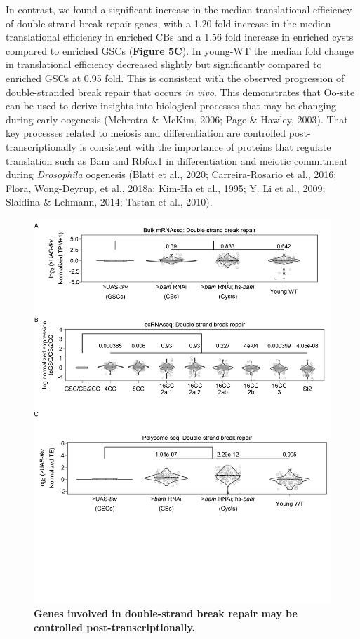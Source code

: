 \documentclass[12pt,oneside]{reedthesis}
\begin{document}
In contrast, we found a significant increase in the median translational
efficiency of double-strand break repair genes, with a 1.20 fold
increase in the median translational efficiency in enriched CBs and a
1.56 fold increase in enriched cysts compared to enriched GSCs (\textbf{Figure
5C}). In young-WT the median fold change in translational efficiency
decreased slightly but significantly compared to enriched GSCs at 0.95
fold. This is consistent with the observed progression of
double-stranded break repair that occurs \emph{in vivo}. This demonstrates
that Oo-site can be used to derive insights into biological processes
that may be changing during early oogenesis
(Mehrotra \& McKim, 2006; Page \& Hawley, 2003). That key processes related to
meiosis and differentiation are controlled post-transcriptionally is
consistent with the importance of proteins that regulate translation
such as Bam and Rbfox1 in differentiation and meiotic commitment during
\emph{Drosophila} oogenesis (Blatt et al., 2020; Carreira-Rosario et al., 2016; Flora, Wong-Deyrup, et al., 2018a; Kim-Ha et al., 1995; Y. Li et al., 2009; Slaidina \& Lehmann, 2014; Tastan et al., 2010).
\begin{figure}

{\centering \includegraphics[width=1\linewidth]{./figure/Oo_site/Figure5} 

}

\caption[\textbf{Genes involved in double-strand break repair may be controlled post-transcriptionally.}]{\textbf{Genes involved in double-strand break repair may be controlled post-transcriptionally.}}\label{fig:oosite-fig-8}
\end{figure}
\end{document}
